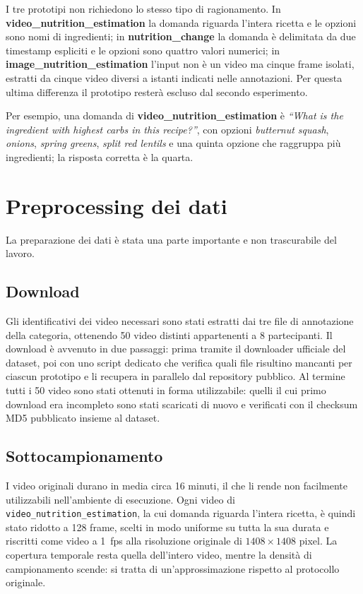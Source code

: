 \documentclass{article}
\begin{document}
I tre prototipi non richiedono lo stesso tipo di ragionamento. In
\textbf{video\_nutrition\allowbreak\_estimation} la domanda riguarda l'intera ricetta e le
opzioni sono nomi di ingredienti; in \textbf{nutrition\allowbreak\_change} la domanda è
delimitata da due timestamp espliciti e le opzioni sono quattro valori
numerici; in \textbf{image\_nutrition\allowbreak\_estimation} l'input non è un video ma
cinque frame isolati, estratti da cinque video diversi a istanti indicati
nelle annotazioni. Per questa ultima differenza il prototipo resterà escluso dal secondo
esperimento.

Per esempio, una domanda di \textbf{video\_nutrition\allowbreak\_estimation} è
\emph{``What is the ingredient with highest carbs in this recipe?''}, con opzioni
\emph{butternut squash}, \emph{onions}, \emph{spring greens}, \emph{split red
lentils} e una quinta opzione che raggruppa più ingredienti; la risposta corretta
è la quarta.

\section{Preprocessing dei dati}

La preparazione dei dati è stata una parte importante e non trascurabile del lavoro.

\subsection{Download}

Gli identificativi dei video necessari sono stati estratti dai tre file di
annotazione della categoria, ottenendo 50 video distinti appartenenti a 8
partecipanti. Il download è avvenuto in due passaggi: prima tramite il
downloader ufficiale del dataset, poi con uno script dedicato che verifica quali
file risultino mancanti per ciascun prototipo e li recupera in parallelo dal
repository pubblico. Al termine tutti i 50 video sono stati ottenuti in forma
utilizzabile: quelli il cui primo download era incompleto sono stati scaricati
di nuovo e verificati con il checksum MD5 pubblicato insieme al dataset.

\subsection{Sottocampionamento}

I video originali durano in media circa 16 minuti, il che li
rende non facilmente utilizzabili
nell'ambiente di esecuzione. Ogni video di \texttt{video\_nutrition\allowbreak\_estimation}, la cui
domanda riguarda l'intera ricetta, è quindi stato ridotto a 128
frame, scelti in modo uniforme su tutta la sua durata e riscritti come
video a 1~fps alla risoluzione originale di $1408\times1408$ pixel. La copertura
temporale resta quella dell'intero video, mentre la densità di campionamento
scende: si tratta di un'approssimazione rispetto al protocollo originale.
\end{document}
